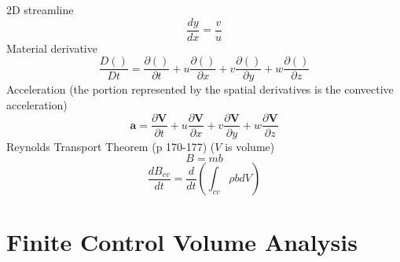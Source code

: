 \documentclass{article}
\begin{document}
2D streamline 
\begin{equation}
    \frac{dy}{dx}=\frac{v}{u}
\end{equation}
\newline
\newline
Material derivative
\begin{equation}
    \frac{D()}{Dt} = \frac{\partial()}{\partial t} + u\frac{\partial()}{\partial x} + v\frac{\partial()}{\partial y} + w\frac{\partial()}{\partial z}
\end{equation}
\newline
\newline
Acceleration (the portion represented by the spatial derivatives is the convective acceleration)
\begin{equation}
    \mathbf{a} = \frac{\partial\mathbf{V}}{\partial t} + u\frac{\partial\mathbf{V}}{\partial x} + v\frac{\partial\mathbf{V}}{\partial y} + w\frac{\partial\mathbf{V}}{\partial z}
\end{equation}
\newline
\newline
Reynolds Transport Theorem (p 170-177) ($V$ is volume)
\begin{equation}
    B=mb
\end{equation}
\begin{equation}
    \frac{dB_{cv}}{dt}=\frac{d}{dt}\left(\int_{cv}\rho b dV\right)
\end{equation}

    

%
%
\newpage
\section{Finite Control Volume Analysis}
\end{document}
